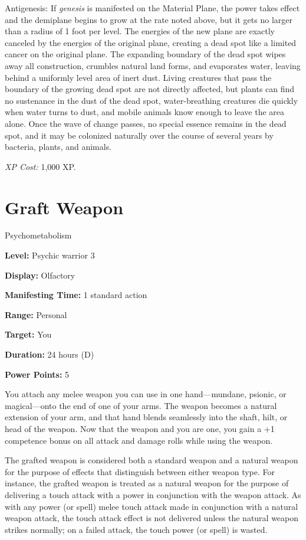 \documentclass{article}
\begin{document}
Antigenesis: If \textit{genesis }is manifested on the Material Plane, the power 
takes effect and the demiplane begins to grow at the rate noted above, but it gets 
no larger than a radius of 1 foot per level. The energies of the new plane are 
exactly canceled by the energies of the original plane, creating a dead spot like 
a limited cancer on the original plane. The expanding boundary of the dead spot 
wipes away all construction, crumbles natural land forms, and evaporates water, 
leaving behind a uniformly level area of inert dust. Living creatures that pass 
the boundary of the growing dead spot are not directly affected, but plants can 
find no sustenance in the dust of the dead spot, water-breathing creatures die 
quickly when water turns to dust, and mobile animals know enough to leave the area 
alone. Once the wave of change passes, no special essence remains in the dead spot, 
and it may be colonized naturally over the course of several years by bacteria, 
plants, and animals.

\textit{XP Cost: }1,000 XP.

\vspace{12pt}
\section*{Graft Weapon}

Psychometabolism

\textbf{Level:} Psychic warrior 3

\textbf{Display:} Olfactory

\textbf{Manifesting Time:} 1 standard action

\textbf{Range:} Personal

\textbf{Target:} You

\textbf{Duration:} 24 hours (D)

\textbf{Power Points:} 5

You attach any melee weapon you can use in one hand---mundane, psionic, or magical---onto 
the end of one of your arms. The weapon becomes a natural extension of your arm, 
and that hand blends seamlessly into the shaft, hilt, or head of the weapon. Now 
that the weapon and you are one, you gain a +1 competence bonus on all attack and 
damage rolls while using the weapon.

The grafted weapon is considered both a standard weapon and a natural weapon for 
the purpose of effects that distinguish between either weapon type. For instance, 
the grafted weapon is treated as a natural weapon for the purpose of delivering 
a touch attack with a power in conjunction with the weapon attack. As with any 
power (or spell) melee touch attack made in conjunction with a natural weapon attack, 
the touch attack effect is not delivered unless the natural weapon strikes normally; 
on a failed attack, the touch power (or spell) is wasted.
\end{document}
